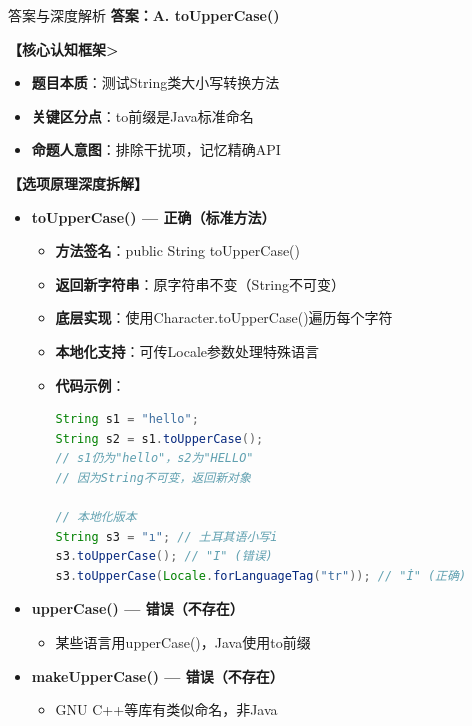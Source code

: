 \documentclass[12pt, a4paper]{ctexart}
\begin{document}
\begin{enumerate}[label=\textbf{\arabic*.}]
	      \begin{bluebox}{答案与深度解析}
		      \textbf{答案：A. toUpperCase()}

		      \textbf{【核心认知框架>}
		      \begin{itemize}[label={}, leftmargin=*, nosep]
			      \item \textbf{题目本质}：测试String类大小写转换方法
			      \item \textbf{关键区分点}：to前缀是Java标准命名
			      \item \textbf{命题人意图}：排除干扰项，记忆精确API
		      \end{itemize}

		      \textbf{【选项原理深度拆解】}

		      \begin{itemize}[leftmargin=*, nosep, label={}]
			      \item[A] \textbf{toUpperCase() — 正确（标准方法）}
			            \begin{itemize}[label={}, leftmargin=*, nosep]
				            \item \textbf{方法签名}：public String toUpperCase()
				            \item \textbf{返回新字符串}：原字符串不变（String不可变）
				            \item \textbf{底层实现}：使用Character.toUpperCase()遍历每个字符
				            \item \textbf{本地化支持}：可传Locale参数处理特殊语言
				            \item \textbf{代码示例}：
				                  \begin{lstlisting}[language=Java]
String s1 = "hello";
String s2 = s1.toUpperCase();
// s1仍为"hello"，s2为"HELLO"
// 因为String不可变，返回新对象

// 本地化版本
String s3 = "ı"; // 土耳其语小写i
s3.toUpperCase(); // "I" (错误)
s3.toUpperCase(Locale.forLanguageTag("tr")); // "İ" (正确)
				            \end{lstlisting}
			            \end{itemize}

			      \item[B] \textbf{upperCase() — 错误（不存在）}
			            \begin{itemize}[label={}, leftmargin=*, nosep]
				            \item 某些语言用upperCase()，Java使用to前缀
			            \end{itemize}

			      \item[C] \textbf{makeUpperCase() — 错误（不存在）}
			            \begin{itemize}[label={}, leftmargin=*, nosep]
				            \item GNU C++等库有类似命名，非Java
			            \end{itemize}


\end{itemize}
\end{bluebox}
\end{enumerate}
\end{document}
